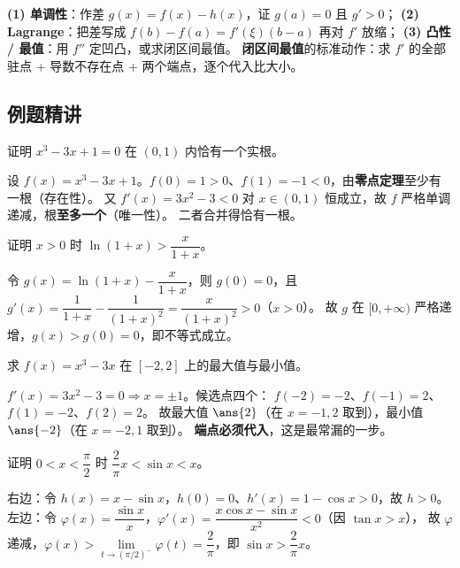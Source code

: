 \documentclass[11pt,a4paper]{ctexart}
\begin{document}
\begin{keypoint}[不等式三条路]
\textbf{(1) 单调性}：作差 $g(x)=f(x)-h(x)$，证 $g(a)=0$ 且 $g'>0$；
\textbf{(2) Lagrange}：把差写成 $f(b)-f(a)=f'(\xi)(b-a)$ 再对 $f'$ 放缩；
\textbf{(3) 凸性 / 最值}：用 $f''$ 定凹凸，或求闭区间最值。
\textbf{闭区间最值}的标准动作：求 $f'$ 的全部驻点 + 导数不存在点 + 两个端点，逐个代入比大小。
\end{keypoint}

\subsection{例题精讲}

\begin{exa}[存在与唯一要分开证]
证明 $x^3-3x+1=0$ 在 $(0,1)$ 内恰有一个实根。
\end{exa}
\begin{solution}
设 $f(x)=x^3-3x+1$。$f(0)=1>0$、$f(1)=-1<0$，由\textbf{零点定理}至少有一根（存在性）。
又 $f'(x)=3x^2-3<0$ 对 $x\in(0,1)$ 恒成立，故 $f$ 严格单调递减，根\textbf{至多一个}（唯一性）。
二者合并得恰有一根。
\end{solution}

\begin{exa}[单调性证不等式]
证明 $x>0$ 时 $\ln(1+x)>\dfrac{x}{1+x}$。
\end{exa}
\begin{solution}
令 $g(x)=\ln(1+x)-\dfrac{x}{1+x}$，则 $g(0)=0$，且
$g'(x)=\dfrac1{1+x}-\dfrac1{(1+x)^2}=\dfrac{x}{(1+x)^2}>0$（$x>0$）。
故 $g$ 在 $[0,+\infty)$ 严格递增，$g(x)>g(0)=0$，即不等式成立。
\end{solution}

\begin{exa}[闭区间最值]
求 $f(x)=x^3-3x$ 在 $[-2,2]$ 上的最大值与最小值。
\end{exa}
\begin{solution}
$f'(x)=3x^2-3=0\Rightarrow x=\pm1$。候选点四个：
$f(-2)=-2$、$f(-1)=2$、$f(1)=-2$、$f(2)=2$。
故最大值 $\ans{2}$（在 $x=-1,2$ 取到），最小值 $\ans{-2}$（在 $x=-2,1$ 取到）。
\textbf{端点必须代入}，这是最常漏的一步。
\end{solution}

\begin{exa}[经典双边不等式]
证明 $0<x<\dfrac\pi2$ 时 $\dfrac{2}{\pi}x<\sin x<x$。
\end{exa}
\begin{solution}
右边：令 $h(x)=x-\sin x$，$h(0)=0$、$h'(x)=1-\cos x>0$，故 $h>0$。
左边：令 $\varphi(x)=\dfrac{\sin x}{x}$，$\varphi'(x)=\dfrac{x\cos x-\sin x}{x^2}<0$（因 $\tan x>x$），
故 $\varphi$ 递减，$\varphi(x)>\lim\limits_{t\to(\pi/2)^-}\varphi(t)=\dfrac{2}{\pi}$，即 $\sin x>\dfrac{2}{\pi}x$。
\end{solution}
\end{document}
